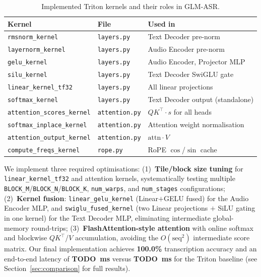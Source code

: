 \documentclass{article} %
\begin{document}
\begin{table}[h!]
\vspace{-1ex}
\centering
\small
\begin{tabular}{lll}
\toprule
\textbf{Kernel} & \textbf{File} & \textbf{Used in} \\
\midrule
\texttt{rmsnorm\_kernel}            & \texttt{layers.py}    & Text Decoder pre-norm \\
\texttt{layernorm\_kernel}          & \texttt{layers.py}    & Audio Encoder pre-norm \\
\texttt{gelu\_kernel}               & \texttt{layers.py}    & Audio Encoder, Projector MLP \\
\texttt{silu\_kernel}               & \texttt{layers.py}    & Text Decoder SwiGLU gate \\
\texttt{linear\_kernel\_tf32}       & \texttt{layers.py}    & All linear projections \\
\texttt{softmax\_kernel}            & \texttt{layers.py}    & Text Decoder output (standalone) \\
\texttt{attention\_scores\_kernel}  & \texttt{attention.py} & $QK^{\top}\!\cdot\!s$ for all heads \\
\texttt{softmax\_inplace\_kernel}   & \texttt{attention.py} & Attention weight normalisation \\
\texttt{attention\_output\_kernel}  & \texttt{attention.py} & $\mathrm{attn}\cdot V$ \\
\texttt{compute\_freqs\_kernel}     & \texttt{rope.py}      & RoPE $\cos$/$\sin$ cache \\
\bottomrule
\end{tabular}
\caption{Implemented Triton kernels and their roles in GLM-ASR.}
\label{tab:kernels}
\vspace{-1.5ex}
\end{table}

We implement three required optimisations:
(1)~\textbf{Tile/block size tuning} for \texttt{linear\_kernel\_tf32} and attention kernels, systematically testing multiple \texttt{BLOCK\_M}/\texttt{BLOCK\_N}/\texttt{BLOCK\_K}, \texttt{num\_warps}, and \texttt{num\_stages} configurations;
(2)~\textbf{Kernel fusion}: \texttt{linear\_gelu\_kernel} (Linear$+$GELU fused) for the Audio Encoder MLP, and \texttt{swiglu\_fused\_kernel} (two Linear projections $+$ SiLU gating in one kernel) for the Text Decoder MLP, eliminating intermediate global-memory round-trips;
(3)~\textbf{FlashAttention-style attention} with online softmax and blockwise $QK^{\top}$/$V$ accumulation, avoiding the $O(\mathrm{seq}^2)$ intermediate score matrix.
Our final implementation achieves \textbf{100.0\%} transcription accuracy and
an end-to-end latency of \textbf{TODO~ms} versus \textbf{TODO~ms} for the Triton baseline
(see Section~\ref{sec:comparison} for full results).
\end{document}
